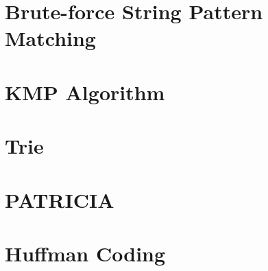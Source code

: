 \documentclass{report}
\begin{document}
\section{Brute-force String Pattern Matching}

\section{KMP Algorithm}

\section{Trie}

\section{PATRICIA}

\section{Huffman Coding}
\end{document}
